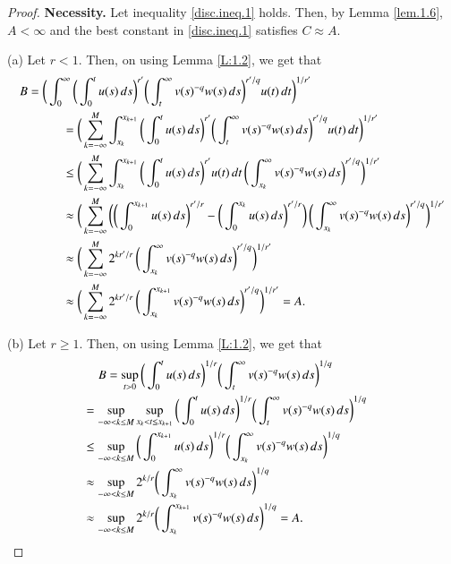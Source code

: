 \documentclass[12pt]{amsart}
\theoremstyle{plain}
\theoremstyle{definition}
\numberwithin{thm}{section}
\numberwithin{equation}{section}
\begin{document}
\begin{proof}
	{\bf Necessity.} Let inequality \eqref{disc.ineq.1} holds. Then, by Lemma \ref{lem.1.6}, $A < \infty$ and the best constant in \eqref{disc.ineq.1} satisfies $C \approx A$.
	
	{\rm (a)} Let $r < 1$. Then, on using Lemma \ref{L:1.2}, we get that
	\begin{align*}
	B = \bigg( \int_0^{\infty} \bigg( \int_0^t u(s)\,ds\bigg)^{r'} \bigg( \int_t^{\infty} v(s)^{-q} w(s)\,ds \bigg)^{ r' / q}u(t)\,dt \bigg)^{1/r'} & \\
	& \hspace{-7cm} = \bigg( \sum_{k = -\infty}^M \int_{x_k}^{x_{k+1}} \bigg( \int_0^t u(s)\,ds\bigg)^{r'} \bigg( \int_t^{\infty} v(s)^{-q} w(s)\,ds \bigg)^{ r' / q}u(t)\,dt \bigg)^{1/r'} \\
	& \hspace{-7cm} \le \bigg( \sum_{k = -\infty}^M \int_{x_k}^{x_{k+1}} \bigg( \int_0^t u(s)\,ds\bigg)^{r'} u(t)\,dt \,\bigg( \int_{x_k}^{\infty} v(s)^{-q} w(s)\,ds \bigg)^{ r' / q} \bigg)^{1/r'} \\
	& \hspace{-7cm} \approx \bigg( \sum_{k = -\infty}^M \bigg( \bigg( \int_0^{x_{k+1}} u(s)\,ds \bigg)^{r' / r} - \bigg( \int_0^{x_{k}} u(s)\,ds\bigg)^{r' / r} \bigg)\,\bigg( \int_{x_k}^{\infty} v(s)^{-q} w(s)\,ds \bigg)^{ r' / q} \bigg)^{1/r'} \\
	& \hspace{-7cm} \approx \bigg( \sum_{k = -\infty}^M 2^{kr' / r} \,\bigg( \int_{x_k}^{\infty} v(s)^{-q} w(s)\,ds \bigg)^{ r' / q} \bigg)^{1/r'} \\
	& \hspace{-7cm} \approx \bigg( \sum_{k = -\infty}^M 2^{kr' / r} \,\bigg( \int_{x_k}^{x_{k+1}} v(s)^{-q} w(s)\,ds \bigg)^{ r' / q} \bigg)^{1/r'} = A.
	\end{align*}
	
	{\rm (b)} Let $r \ge 1$. Then, on using Lemma \ref{L:1.2}, we get that
	\begin{align*}
	B = \sup_{t > 0} \bigg( \int_0^t u(s)\,ds \bigg)^{1 / r} \bigg( \int_t^{\infty} v(s)^{-q} w(s)\,ds \bigg)^{ 1 / q} & \\
	& \hspace{-7cm} =  \sup_{-\infty < k \le M} \sup_{{x_k} < t \le {x_{k+1}}} \bigg( \int_0^t u(s)\,ds \bigg)^{1 / r} \bigg( \int_t^{\infty} v(s)^{-q} w(s)\,ds \bigg)^{ 1 / q} \\
	& \hspace{-7cm} \le \sup_{-\infty < k \le M} \bigg( \int_0^{x_{k+1}} u(s)\,ds \bigg)^{1 / r} \bigg( \int_{x_k}^{\infty} v(s)^{-q} w(s)\,ds \bigg)^{ 1 / q} \\	
	& \hspace{-7cm} \approx \sup_{-\infty < k \le M} 2^{k / r} \bigg( \int_{x_k}^{\infty} v(s)^{-q} w(s)\,ds \bigg)^{ 1 / q} \\
	& \hspace{-7cm} \approx \sup_{-\infty < k \le M} 2^{k / r} \bigg( \int_{x_k}^{x_{k+1}} v(s)^{-q} w(s)\,ds \bigg)^{ 1 / q} = A.
	\end{align*}	
	

\end{proof}
\end{document}
